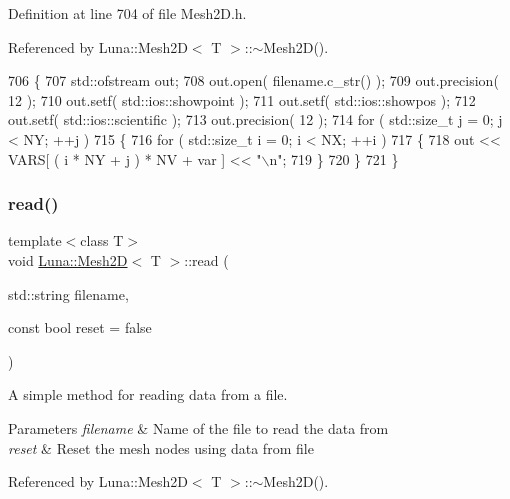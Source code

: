 Definition at line 704 of file Mesh2\+D.\+h.



Referenced by Luna\+::\+Mesh2\+D$<$ T $>$\+::$\sim$\+Mesh2\+D().


\begin{DoxyCode}
706   \{
707     std::ofstream out;
708     out.open( filename.c\_str() );
709     out.precision( 12 );
710     out.setf( std::ios::showpoint );
711     out.setf( std::ios::showpos );
712     out.setf( std::ios::scientific );
713     out.precision( 12 );
714     \textcolor{keywordflow}{for} ( std::size\_t j = 0; j < NY; ++j )
715     \{
716       \textcolor{keywordflow}{for} ( std::size\_t i = 0; i < NX; ++i )
717       \{
718         out << VARS[ ( i * NY + j ) * NV + var ] << \textcolor{stringliteral}{"\(\backslash\)n"};
719       \}
720     \}
721   \}
\end{DoxyCode}
\mbox{\label{classLuna_1_1Mesh2D_a21825e991e96d5cfad2dc9de68cf5f73}} 
\subsubsection{\texorpdfstring{read()}{read()}\hspace{0.1cm}{\footnotesize\ttfamily [1/2]}}
{\footnotesize\ttfamily template$<$class T$>$ \\
void \hyperlink{classLuna_1_1Mesh2D}{Luna\+::\+Mesh2D}$<$ T $>$\+::read (\begin{DoxyParamCaption}\item[{std\+::string}]{filename,  }\item[{const bool}]{reset = {\ttfamily false} }\end{DoxyParamCaption})}



A simple method for reading data from a file. 


\begin{DoxyParams}{Parameters}
{\em filename} & Name of the file to read the data from \\
\hline
{\em reset} & Reset the mesh nodes using data from file \\
\hline
\end{DoxyParams}


Referenced by Luna\+::\+Mesh2\+D$<$ T $>$\+::$\sim$\+Mesh2\+D().

\mbox{\label{classLuna_1_1Mesh2D_acf187c6339ea8527fa70f2d5e74abe41}} 
